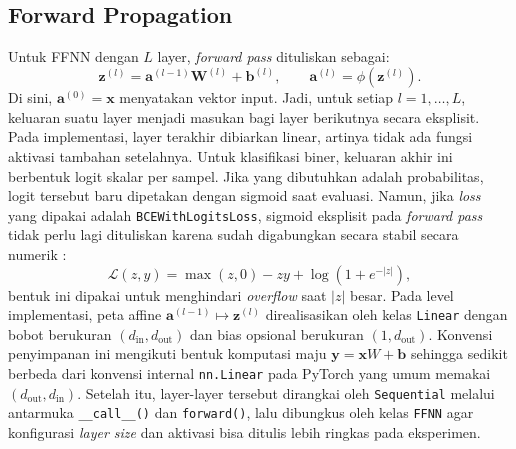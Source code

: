 \documentclass{article}
\begin{document}
\subsection{Forward Propagation}
\label{subsec:forward}
Untuk FFNN dengan $L$ layer, \textit{forward pass} dituliskan sebagai:
\begin{equation}
\mathbf{z}^{(l)} = \mathbf{a}^{(l-1)}\mathbf{W}^{(l)} + \mathbf{b}^{(l)},\qquad \mathbf{a}^{(l)} = \phi\left(\mathbf{z}^{(l)}\right).
\end{equation}
Di sini, $\mathbf{a}^{(0)}=\mathbf{x}$ menyatakan vektor input. Jadi, untuk setiap $l=1,\dots,L$, keluaran suatu layer menjadi masukan bagi layer berikutnya secara eksplisit.
Pada implementasi, layer terakhir dibiarkan linear, artinya tidak ada fungsi aktivasi tambahan setelahnya. Untuk klasifikasi biner, keluaran akhir ini berbentuk logit skalar per sampel. Jika yang dibutuhkan adalah probabilitas, logit tersebut baru dipetakan dengan sigmoid saat evaluasi. Namun, jika \textit{loss} yang dipakai adalah \texttt{BCEWithLogitsLoss}, sigmoid eksplisit pada \textit{forward pass} tidak perlu lagi dituliskan karena sudah digabungkan secara stabil secara numerik \citep{pytorch_bcewithlogitsloss}:
\begin{equation}
\mathcal{L}(z,y)=\max(z,0) - zy + \log\left(1+e^{-|z|}\right),
\end{equation}
bentuk ini dipakai untuk menghindari \textit{overflow} saat $|z|$ besar.
Pada level implementasi, peta affine $\mathbf{a}^{(l-1)}\mapsto \mathbf{z}^{(l)}$ direalisasikan oleh kelas \texttt{Linear} dengan bobot berukuran $(d_{\mathrm{in}},d_{\mathrm{out}})$ dan bias opsional berukuran $(1,d_{\mathrm{out}})$. Konvensi penyimpanan ini mengikuti bentuk komputasi maju $\mathbf{y}=\mathbf{x}W+\mathbf{b}$ sehingga sedikit berbeda dari konvensi internal \texttt{nn.Linear} pada PyTorch yang umum memakai $(d_{\mathrm{out}},d_{\mathrm{in}})$. Setelah itu, layer-layer tersebut dirangkai oleh \texttt{Sequential} melalui antarmuka \texttt{\_\_call\_\_()} dan \texttt{forward()}, lalu dibungkus oleh kelas \texttt{FFNN} agar konfigurasi \textit{layer size} dan aktivasi bisa ditulis lebih ringkas pada eksperimen.
\end{document}
